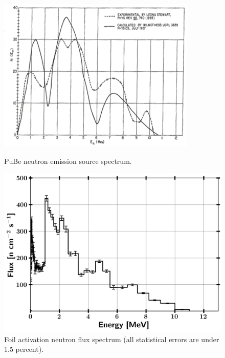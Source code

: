 \documentclass[journal]{IEEEtran}
\let\MYoriglatexcaption\caption
\renewcommand{\caption}[2][\relax]{\MYoriglatexcaption[#2]{#2}}
\begin{document}
\begin{figure}[h!]
\includegraphics[width=\linewidth]{Figures/PuBe.png}
\caption{PuBe neutron emission source spectrum.}
\label{fig:PuBE}

\vskip 0.25cm

\includegraphics[width=\linewidth]{Figures/PileSpec.png}
\caption{Foil activation neutron flux spectrum (all statistical errors are under 1.5 percent).}
\label{fig:Spec1}
\end{figure}
\end{document}
